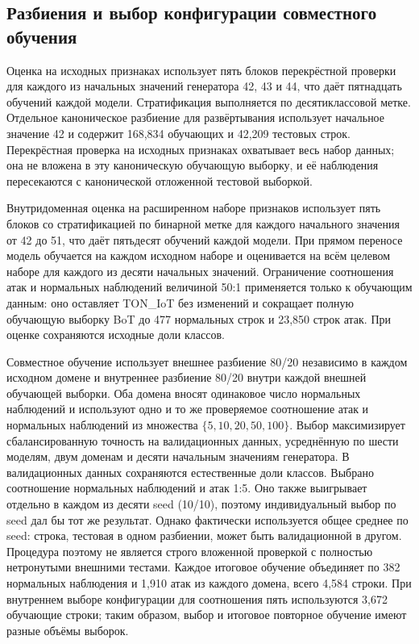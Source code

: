 \subsection{Разбиения и выбор конфигурации совместного обучения}
Оценка на исходных признаках использует пять блоков перекрёстной проверки для каждого из начальных значений генератора 42, 43 и 44, что даёт пятнадцать обучений каждой модели. Стратификация выполняется по десятиклассовой метке. Отдельное каноническое разбиение для развёртывания использует начальное значение 42 и содержит 168,834 обучающих и 42,209 тестовых строк. Перекрёстная проверка на исходных признаках охватывает весь набор данных; она не вложена в эту каноническую обучающую выборку, и её наблюдения пересекаются с канонической отложенной тестовой выборкой.

Внутридоменная оценка на расширенном наборе признаков использует пять блоков со стратификацией по бинарной метке для каждого начального значения от 42 до 51, что даёт пятьдесят обучений каждой модели. При прямом переносе модель обучается на каждом исходном наборе и оценивается на всём целевом наборе для каждого из десяти начальных значений. Ограничение соотношения атак и нормальных наблюдений величиной 50:1 применяется только к обучающим данным: оно оставляет TON\_IoT без изменений и сокращает полную обучающую выборку BoT до 477 нормальных строк и 23,850 строк атак. При оценке сохраняются исходные доли классов.

Совместное обучение использует внешнее разбиение 80/20 независимо в каждом исходном домене и внутреннее разбиение 80/20 внутри каждой внешней обучающей выборки. Оба домена вносят одинаковое число нормальных наблюдений и используют одно и то же проверяемое соотношение атак и нормальных наблюдений из множества $\{5,10,20,50,100\}$. Выбор максимизирует сбалансированную точность на валидационных данных, усреднённую по шести моделям, двум доменам и десяти начальным значениям генератора. В валидационных данных сохраняются естественные доли классов. Выбрано соотношение нормальных наблюдений и атак 1:5. Оно также выигрывает отдельно в каждом из десяти seed (10/10), поэтому индивидуальный выбор по seed дал бы тот же результат. Однако фактически используется общее среднее по seed: строка, тестовая в одном разбиении, может быть валидационной в другом. Процедура поэтому не является строго вложенной проверкой с полностью нетронутыми внешними тестами. Каждое итоговое обучение объединяет по 382 нормальных наблюдения и 1,910 атак из каждого домена, всего 4,584 строки. При внутреннем выборе конфигурации для соотношения пять используются 3,672 обучающие строки; таким образом, выбор и итоговое повторное обучение имеют разные объёмы выборок.

